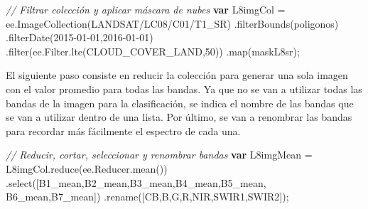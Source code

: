 \documentclass[
  12pt,
  letterpaper,
  twoside]{book}
\newenvironment{Shaded}{\begin{snugshade}}{\end{snugshade}}
\newcommand{\AttributeTok}[1]{\textcolor[rgb]{0.48,0.12,0.64}{#1}}
\newcommand{\CommentTok}[1]{\textcolor[rgb]{0.24,0.58,0.00}{\textit{#1}}}
\newcommand{\ControlFlowTok}[1]{\textcolor[rgb]{0.00,0.00,0.00}{\textbf{#1}}}
\newcommand{\DecValTok}[1]{\textcolor[rgb]{0.28,0.53,0.93}{#1}}
\newcommand{\FunctionTok}[1]{\textcolor[rgb]{0.48,0.12,0.64}{#1}}
\newcommand{\KeywordTok}[1]{\textcolor[rgb]{0.48,0.12,0.64}{#1}}
\newcommand{\NormalTok}[1]{#1}
\newcommand{\OperatorTok}[1]{\textcolor[rgb]{0.00,0.00,0.00}{#1}}
\newcommand{\StringTok}[1]{\textcolor[rgb]{0.87,0.29,0.22}{#1}}
\begin{document}
\begin{Shaded}
\begin{Highlighting}[]
\CommentTok{// Filtrar colección y aplicar máscara de nubes}
\ControlFlowTok{var}\NormalTok{ L8imgCol }\OperatorTok{=} \KeywordTok{ee}\OperatorTok{.}\FunctionTok{ImageCollection}\NormalTok{(}\StringTok{\textquotesingle{}LANDSAT/LC08/C01/T1\_SR\textquotesingle{}}\NormalTok{)}
  \OperatorTok{.}\FunctionTok{filterBounds}\NormalTok{(poligonos)}
  \OperatorTok{.}\FunctionTok{filterDate}\NormalTok{(}\StringTok{\textquotesingle{}2015{-}01{-}01\textquotesingle{}}\OperatorTok{,}\StringTok{\textquotesingle{}2016{-}01{-}01\textquotesingle{}}\NormalTok{)}
  \OperatorTok{.}\FunctionTok{filter}\NormalTok{(}\KeywordTok{ee}\OperatorTok{.}\AttributeTok{Filter}\OperatorTok{.}\FunctionTok{lte}\NormalTok{(}\StringTok{\textquotesingle{}CLOUD\_COVER\_LAND\textquotesingle{}}\OperatorTok{,}\DecValTok{50}\NormalTok{))}
  \OperatorTok{.}\FunctionTok{map}\NormalTok{(maskL8sr)}\OperatorTok{;}
\end{Highlighting}
\end{Shaded}

El siguiente paso consiste en reducir la colección para generar una sola imagen con el valor promedio para todas las bandas. Ya que no se van a utilizar todas las bandas de la imagen para la clasificación, se indica el nombre de las bandas que se van a utilizar dentro de una lista. Por último, se van a renombrar las bandas para recordar más fácilmente el espectro de cada una.

\begin{Shaded}
\begin{Highlighting}[]
\CommentTok{// Reducir, cortar, seleccionar y renombrar bandas}
\ControlFlowTok{var}\NormalTok{ L8imgMean }\OperatorTok{=}\NormalTok{ L8imgCol}\OperatorTok{.}\FunctionTok{reduce}\NormalTok{(}\KeywordTok{ee}\OperatorTok{.}\AttributeTok{Reducer}\OperatorTok{.}\FunctionTok{mean}\NormalTok{())}
  \OperatorTok{.}\FunctionTok{select}\NormalTok{([}\StringTok{\textquotesingle{}B1\_mean\textquotesingle{}}\OperatorTok{,}\StringTok{\textquotesingle{}B2\_mean\textquotesingle{}}\OperatorTok{,}\StringTok{\textquotesingle{}B3\_mean\textquotesingle{}}\OperatorTok{,}\StringTok{\textquotesingle{}B4\_mean\textquotesingle{}}\OperatorTok{,}\StringTok{\textquotesingle{}B5\_mean\textquotesingle{}}\OperatorTok{,}
  \StringTok{\textquotesingle{}B6\_mean\textquotesingle{}}\OperatorTok{,}\StringTok{\textquotesingle{}B7\_mean\textquotesingle{}}\NormalTok{])}
  \OperatorTok{.}\FunctionTok{rename}\NormalTok{([}\StringTok{\textquotesingle{}CB\textquotesingle{}}\OperatorTok{,}\StringTok{\textquotesingle{}B\textquotesingle{}}\OperatorTok{,}\StringTok{\textquotesingle{}G\textquotesingle{}}\OperatorTok{,}\StringTok{\textquotesingle{}R\textquotesingle{}}\OperatorTok{,}\StringTok{\textquotesingle{}NIR\textquotesingle{}}\OperatorTok{,}\StringTok{\textquotesingle{}SWIR1\textquotesingle{}}\OperatorTok{,}\StringTok{\textquotesingle{}SWIR2\textquotesingle{}}\NormalTok{])}\OperatorTok{;}
\end{Highlighting}
\end{Shaded}
\end{document}
